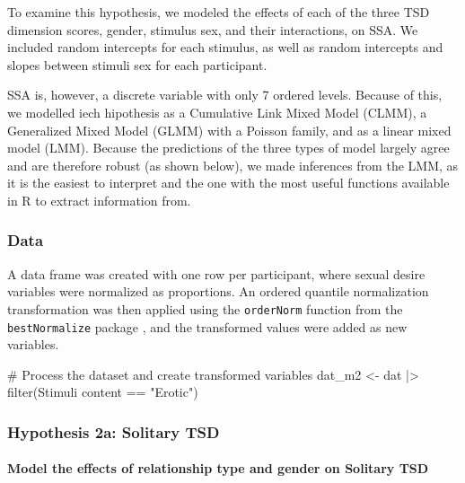 \documentclass[
  bookmarksnumbered]{article}
\newenvironment{Shaded}{\begin{snugshade}}{\end{snugshade}}
\newcommand{\AttributeTok}[1]{\textcolor[rgb]{0.80,0.80,0.80}{#1}}
\newcommand{\CommentTok}[1]{\textcolor[rgb]{0.50,0.62,0.50}{#1}}
\newcommand{\FunctionTok}[1]{\textcolor[rgb]{0.94,0.94,0.56}{#1}}
\newcommand{\NormalTok}[1]{\textcolor[rgb]{0.80,0.80,0.80}{#1}}
\newcommand{\OtherTok}[1]{\textcolor[rgb]{0.94,0.94,0.56}{#1}}
\newcommand{\SpecialCharTok}[1]{\textcolor[rgb]{0.86,0.64,0.64}{#1}}
\newcommand{\StringTok}[1]{\textcolor[rgb]{0.80,0.58,0.58}{#1}}
\begin{document}
To examine this hypothesis, we modeled the effects of each of the three TSD dimension scores, gender, stimulus sex, and their interactions, on SSA. We included random intercepts for each stimulus, as well as random intercepts and slopes between stimuli sex for each participant.

SSA is, however, a discrete variable with only 7 ordered levels. Because of this, we modelled iech hipothesis as a Cumulative Link Mixed Model (CLMM), a Generalized Mixed Model (GLMM) with a Poisson family, and as a linear mixed model (LMM). Because the predictions of the three types of model largely agree and are therefore robust (as shown below), we made inferences from the LMM, as it is the easiest to interpret and the one with the most useful functions available in R to extract information from.

\subsubsection{Data}\label{data-1}

A data frame was created with one row per participant, where sexual desire variables were normalized as proportions. An ordered quantile normalization transformation \autocite{petersonOrderedQuantileNormalization2020a} was then applied using the \texttt{orderNorm} function from the \texttt{bestNormalize} package \autocite{bestNormalizecit}, and the transformed values were added as new variables.

\begin{Shaded}
\begin{Highlighting}[]
\CommentTok{\# Process the dataset and create transformed variables  }
\NormalTok{dat\_m2 }\OtherTok{\textless{}{-}}\NormalTok{ dat }\SpecialCharTok{|\textgreater{}}
  \FunctionTok{filter}\NormalTok{(}\StringTok{\textasciigrave{}}\AttributeTok{Stimuli content}\StringTok{\textasciigrave{}} \SpecialCharTok{==} \StringTok{"Erotic"}\NormalTok{)}
\end{Highlighting}
\end{Shaded}

\subsubsection{Hypothesis 2a: Solitary TSD}\label{hypothesis2a}

\paragraph{Model the effects of relationship type and gender on Solitary TSD}\label{model-the-effects-of-relationship-type-and-gender-on-solitary-tsd-1}
\end{document}
